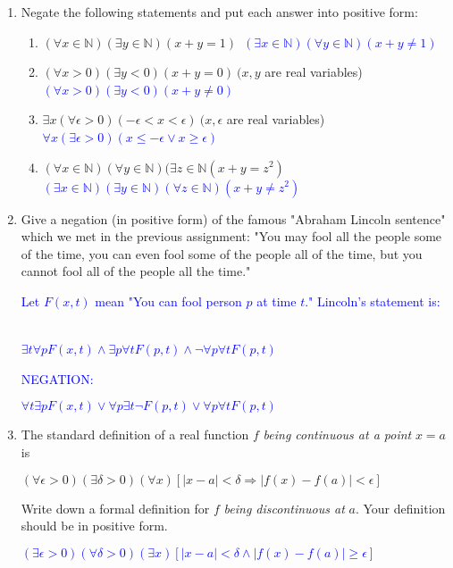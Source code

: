 \documentclass[13.5pt]{article}
\begin{document}
\begin{enumerate}
\item{Negate the following statements and put each answer into positive form:}

\begin{enumerate}
\setlength{\itemindent}{.1in}
\item{\((\forall x \in \mathbb{N})(\exists y \in \mathbb{N})(x+y=1)\)}\
\textcolor{blue} {\((\exists x \in \mathbb{N})(\forall y \in \mathbb{N})(x+y \neq 1)\)}\
\item{\((\forall x>0)(\exists y<0)(x+y=0)\ (x, y \) are real variables)}\
\textcolor{blue} {\((\forall x>0)(\exists y<0)(x+y \neq 0)\)}\
\item{\(\exists x(\forall \epsilon >0)(-\epsilon<x<\epsilon)\ (x, \epsilon \) are real variables)}\
\textcolor{blue} {\(\forall x(\exists \epsilon >0)(x\leq -\epsilon \vee x\geq \epsilon)\)}\
\item{\((\forall x \in \mathbb{N})(\forall y \in \mathbb{N})(\exists z \in \mathbb{N}(x+y=z^2)\)}\
\textcolor{blue} {\((\exists x \in \mathbb{N})(\exists y \in \mathbb{N})(\forall z \in \mathbb{N})(x+y \neq z^2)\)}\
\end{enumerate}

\item{Give a negation (in positive form) of the famous "Abraham Lincoln sentence" which we met in the previous assignment: "You may fool all the people some of the time, you can even fool some of the people all of the time, but you cannot fool all of the people all the time."}\

\textcolor{blue} {Let \(F(x,t) \) mean "You can fool person \(p\) at time \(t\)." Lincoln's statement is: }\

\textcolor{blue} {\( \exists t \forall p F(x,t) \wedge \exists p \forall t F(p,t) \wedge \neg \forall p \forall t F(p,t) \)}\

\textcolor{blue} {NEGATION:}\

\textcolor{blue} {\( \forall t \exists p F(x,t) \vee \forall p \exists t \neg F(p,t) \vee \forall p \forall t F(p,t)\)}

\item{The standard definition of a real function \(f\) \textit{being continuous at a point}  \(x=a\) is}\

\begin{center}
\textit{\((\forall \epsilon > 0)(\exists \delta > 0)(\forall x)[|x-a|<\delta \Rightarrow |f(x)-f(a)| < \epsilon] \)}
\end{center}

{Write down a formal definition for \(f\) \textit{being discontinuous at} \(a\). Your definition should be in positive form.}\

\begin{center}
\textcolor{blue} {\((\exists \epsilon > 0)(\forall \delta > 0)(\exists x)[|x-a|<\delta \wedge |f(x)-f(a)| \geq \epsilon] \)}
\end{center}

\end{enumerate}
\end{document}
